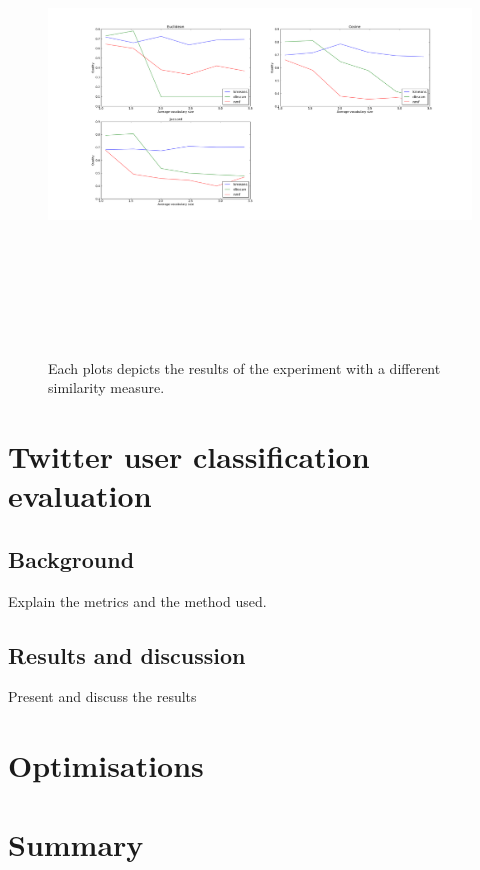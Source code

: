 \begin{figure}[htbp]
  \begin{center}
    \includegraphics[height=5in, width=6in]{vocabulary}
    \caption{Each plots depicts the results of the experiment with a different similarity measure.}
    \label{DifferentVocabularyResults}
  \end{center}
\end{figure}


\section{Twitter user classification evaluation}

\subsection{Background}
Explain the metrics and the method used.

\subsection{Results and discussion}
Present and discuss the results

\section{Optimisations}

\section{Summary}



